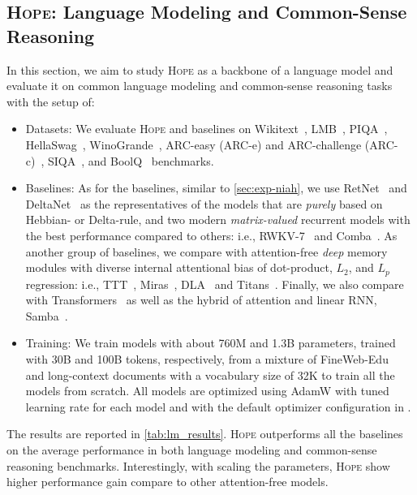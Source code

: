 \documentclass{article}
\newcommand{\citep}{\parencite}
\newcommand{\citet}{\textcite}
\newcommand{\model}[0]{\textsc{Hope}}
\begin{document}
{\subsection{\model: Language Modeling and Common-Sense Reasoning}\label{sec:exp-lm}
In this section, we aim to study \model{} as a backbone of a language model and evaluate it on common language modeling and common-sense reasoning tasks with the setup of: 
\begin{itemize}
    \item Datasets: We evaluate \model{} and baselines on Wikitext~\citep{merity2017pointer}, LMB~\citep{paperno-etal-2016-lambada}, PIQA~\citep{bisk2020piqa}, HellaSwag~\citep{zellers-etal-2019-hellaswag}, WinoGrande~\citep{sakaguchi2021winogrande},  ARC-easy (ARC-e) and ARC-challenge (ARC-c)~\citep{clark2018think}, SIQA~\citep{sap-etal-2019-social}, and BoolQ~\citep{clark-etal-2019-boolq} benchmarks.
    \item {Baselines}: As for the baselines, similar to \autoref{sec:exp-niah}, we use RetNet~\citep{sun2023retentive} and DeltaNet~\citep{schlag2021linear} as the representatives of the models that are \emph{purely} based on Hebbian- or Delta-rule, and two modern \emph{matrix-valued} recurrent models with the best performance compared to others: i.e., RWKV-7~\citep{rwkv-repo} and Comba~\citep{hu2025improving}. As another group of baselines, we compare with attention-free \emph{deep} memory modules with diverse internal attentional bias of dot-product, $L_2$, and $L_p$ regression: i.e., TTT~\citep{sun2024learning}, Miras~\citep{behrouz2025Miras}, DLA~\citep{behrouz2025atlas} and Titans~\citep{behrouz2024titans}. Finally, we also compare with Transformers~\citep{transformers, dubey2024llama} as well as the hybrid of attention and linear RNN, Samba~\citep{ren2024samba}. 
    \item Training: We train models with about 760M and 1.3B parameters, trained with 30B and 100B tokens, respectively, from a mixture of FineWeb-Edu~\citep{penedo2024fineweb} and long-context documents with a vocabulary size of 32K to train all the models from scratch. All models are optimized using AdamW with tuned learning rate for each model and with the default optimizer configuration in \citet{behrouz2024titans}.
\end{itemize}
The results are reported in \autoref{tab:lm_results}. \model{} outperforms all the baselines on the average performance in both language modeling and common-sense reasoning benchmarks. Interestingly, with scaling the parameters, \model{} show higher performance gain compare to other attention-free models. 

}
\end{document}
